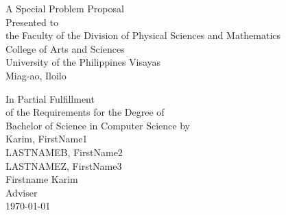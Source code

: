 \begin{titlepage}
\centering


\vspace{1.75cm}
A Special Problem Proposal\\
Presented to\\
the Faculty of the Division of Physical Sciences and Mathematics\\
College of Arts and Sciences\\
University of the Philippines Visayas\\
Miag-ao, Iloilo

\vspace{1.75cm}
In Partial Fulfillment\\
of the Requirements for the Degree of\\
Bachelor of Science in Computer Science
\vspace{1.75cm}
by\\

\vspace{1cm}
Karim, FirstName1  \\
LASTNAMEB, FirstName2  \\
LASTNAMEZ, FirstName3  \\

\vspace{1.75cm}
Firstname Karim \\
Adviser\\

\vspace{1.75cm}
\today
\end{titlepage}
